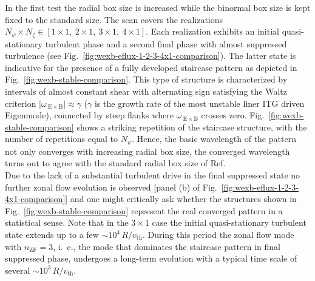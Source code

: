 \documentclass[aip, amsmath, amssymb, reprint, twocolumn]{revtex4-1}
\newcommand{\wexb}{\omega_{\mathrm{\:E \times B}}}
\newcommand{\NR}{N_\psi}
\newcommand{\NB}{N_\zeta}
\newcommand{\vth}{v_{\mathrm{th}}}
\newcommand{\nzf}{n_\mathrm{ZF}}
\begin{document}
In the first test the radial box size is increased while the binormal box size is kept fixed to the standard size.
The scan covers the realizations $\NR\times\NB \in [ 1\times1,~2\times1,~3\times1,~4\times1]$.
Each realization exhibits an initial quasi-stationary turbulent phase and a second final \cite{peeters2016} phase with almost suppressed turbulence (see Fig.~\ref{fig:wexb-eflux-1-2-3-4x1-comparison}).
The latter state is indicative for the presence of a fully developed staircase pattern as depicted in Fig.~\ref{fig:wexb-stable-comparison}. 
This type of structure is characterized by intervals of almost constant shear with alternating sign satisfying the Waltz criterion $|\wexb| \approx \gamma$\cite{doi:10.1063/1.870934, doi:10.1063/1.872847} ($\gamma$ is the growth rate of the most unstable liner ITG driven Eigenmode), connected by steep flanks where $\wexb$ crosses zero.
Fig.~\ref{fig:wexb-stable-comparison} shows a striking repetition of the staircase structure, with the number of repetitions equal to $\NR$.
Hence, the basic wavelength of the pattern not only converges with increasing radial box size, the converged wavelength turns out to agree with the standard radial box size of Ref.~\cite{peeters2016} \\
Due to the lack of a substantial turbulent drive in the final suppressed state no further zonal flow evolution is observed [panel (b) of Fig.~\ref{fig:wexb-eflux-1-2-3-4x1-comparison}] and one might critically ask whether the structures shown in Fig.~\ref{fig:wexb-stable-comparison} represent the real converged pattern in a statistical sense. 
Note that in the $3 \times 1$ case the initial quasi-stationary turbulent state extends up to a few $\sim 10^4\,R/\vth$.
During this period the zonal flow mode with $\nzf = 3$, i.~e., the mode that dominates the staircase pattern in final suppressed phase, undergoes a long-term evolution with a typical time scale of several $\sim 10^3\,R/\vth$. 
\end{document}
